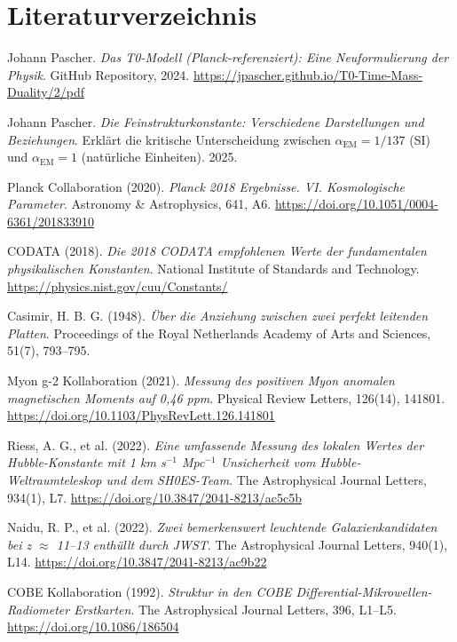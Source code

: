 \documentclass[12pt,a4paper]{article}
\theoremstyle{definition}
\theoremstyle{remark}
\begin{document}
	\section{Literaturverzeichnis}
	
	\begin{thebibliography}{20}
		Johann Pascher.
		\textit{Das T0-Modell (Planck-referenziert): Eine Neuformulierung der Physik}.
		GitHub Repository, 2024.
		\url{https://jpascher.github.io/T0-Time-Mass-Duality/2/pdf}
		
		Johann Pascher.
		\textit{Die Feinstrukturkonstante: Verschiedene Darstellungen und Beziehungen}.
		Erkl\"art die kritische Unterscheidung zwischen $\alpha_{\text{EM}} = 1/137$ (SI) und $\alpha_{\text{EM}} = 1$ (nat\"urliche Einheiten).
		2025.
		
		Planck Collaboration (2020). 
		\textit{Planck 2018 Ergebnisse. VI. Kosmologische Parameter}. 
		Astronomy \& Astrophysics, 641, A6. 
		\url{https://doi.org/10.1051/0004-6361/201833910}
		
		CODATA (2018). 
		\textit{Die 2018 CODATA empfohlenen Werte der fundamentalen physikalischen Konstanten}. 
		National Institute of Standards and Technology. 
		\url{https://physics.nist.gov/cuu/Constants/}
		
		Casimir, H. B. G. (1948). 
		\textit{\"Uber die Anziehung zwischen zwei perfekt leitenden Platten}. 
		Proceedings of the Royal Netherlands Academy of Arts and Sciences, 51(7), 793--795.
		
		Myon g-2 Kollaboration (2021). 
		\textit{Messung des positiven Myon anomalen magnetischen Moments auf 0,46 ppm}. 
		Physical Review Letters, 126(14), 141801. 
		\url{https://doi.org/10.1103/PhysRevLett.126.141801}
		
		Riess, A. G., et al. (2022). 
		\textit{Eine umfassende Messung des lokalen Wertes der Hubble-Konstante mit 1 km s$^{-1}$ Mpc$^{-1}$ Unsicherheit vom Hubble-Weltraumteleskop und dem SH0ES-Team}. 
		The Astrophysical Journal Letters, 934(1), L7. 
		\url{https://doi.org/10.3847/2041-8213/ac5c5b}
		
		Naidu, R. P., et al. (2022). 
		\textit{Zwei bemerkenswert leuchtende Galaxienkandidaten bei z $\approx$ 11--13 enth\"ullt durch JWST}. 
		The Astrophysical Journal Letters, 940(1), L14. 
		\url{https://doi.org/10.3847/2041-8213/ac9b22}
		
		COBE Kollaboration (1992). 
		\textit{Struktur in den COBE Differential-Mikrowellen-Radiometer Erstkarten}. 
		The Astrophysical Journal Letters, 396, L1--L5. 
		\url{https://doi.org/10.1086/186504}
	\end{thebibliography}
	
\end{document}
